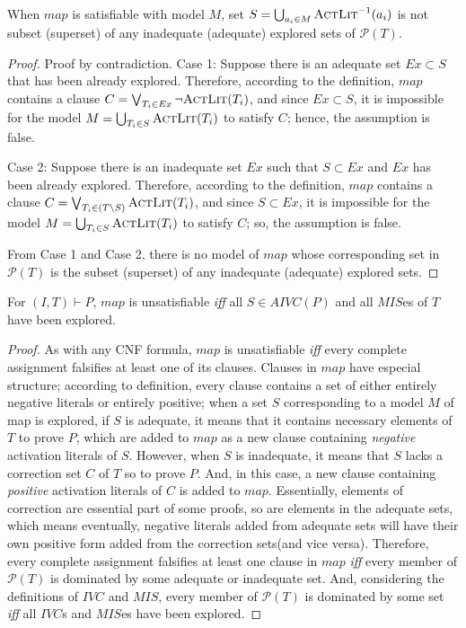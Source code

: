 \begin{lemma}
\label{lem:map:sound}
When $map$ is satisfiable with model $M$, set $S = \bigcup_{a_i \in M} \textsc{ActLit} ^{-1} (a_i)$ is not subset (superset) of any
inadequate (adequate) explored sets of $\mathcal{P}(T)$.
\end{lemma}
\begin{proof}
Proof by contradiction. Case 1: Suppose there is an adequate set $Ex \subset S$ that has been already explored. Therefore, according to the definition, $map$ contains a clause $C = \bigvee_{T_{i}\in Ex} \neg {\textsc{ActLit}(T_i)}$, and since $Ex \subset S$, it is impossible for the model $M = \bigcup_{T_i \in S} \textsc{ActLit} (T_i)$ to satisfy $C$; hence, the assumption is false.

Case 2: Suppose there is an inadequate set $Ex$ such that $S \subset Ex$ and $Ex$ has been already explored. Therefore, according to the definition, $map$ contains a clause $C = \bigvee_{T_{i}\in (T \setminus S)} \textsc{ActLit} (T_i)$, and since $S \subset Ex$, it is impossible for the model $M = \bigcup_{T_i \in S} \textsc{ActLit} (T_i)$ to satisfy $C$; so, the assumption is false.

From Case 1 and Case 2, there is no model of $map$ whose corresponding set in $\mathcal{P}(T)$ is the subset (superset) of any inadequate (adequate) explored sets.
\end{proof}


\begin{lemma}
\label{lem:map:comp}
For $(I, T) \vdash P$, $map$ is unsatisfiable \emph{iff} all $S \in AIVC(P)$ and all $MIS$es of $T$ have been explored.
\end{lemma}
\begin{proof}
As with any CNF formula, $map$ is unsatisfiable \emph{iff} every complete assignment falsifies at least one of its clauses. Clauses in $map$ have especial structure;
according to definition, every clause contains a set of either entirely negative literals or entirely positive; when a set $S$ corresponding to a model $M$ of map is explored, if $S$ is adequate, it means that it contains necessary elements of $T$ to prove $P$, which
are added to $map$ as a new clause containing \emph{negative} activation literals of $S$. However, when
$S$ is inadequate, it means that $S$ lacks a correction set $C$ of $T$ so to prove $P$.
And, in this case, a new clause containing \emph{positive} activation literals of $C$ is added to $map$. Essentially, elements of correction are essential part of some proofs, so are elements in the adequate sets, which means eventually, negative literals added from adequate sets will have their own  positive form added from the correction sets(and vice versa).
Therefore, every complete assignment falsifies at least one clause in $map$ \emph{iff} every
member of $\mathcal{P}(T)$ is dominated by some adequate or inadequate set.
And, considering the definitions of $IVC$ and $MIS$,  every member of $\mathcal{P}(T)$ is dominated by some set \emph{iff} all $IVC$s and $MIS$es have been explored.
\end{proof}

